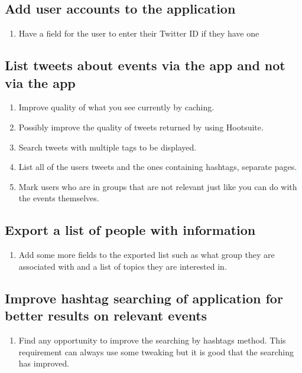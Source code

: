 \documentclass[draftclsnofoot,10pt,onecolumn]{IEEEtran} %
\begin{document}
\subsection{Add user accounts to the application}
\begin{enumerate}
	\item Have a field for the user to enter their Twitter ID if they have one
\end{enumerate}

\subsection{List tweets about events via the app and not via the app}
\begin{enumerate}
	\item Improve quality of what you see currently by caching.
    \item Possibly improve the quality of tweets returned by using Hootsuite.
    \item Search tweets with multiple tags to be displayed.
    \item List all of the users tweets and the ones containing hashtags, separate pages.
    \item Mark users who are in groups that are not relevant just like you can do with the events themselves.
\end{enumerate}

\subsection{Export a list of people with information}
\begin{enumerate}
	\item Add some more fields to the exported list such as what group they are associated with and a list of topics they are interested in.
\end{enumerate}

\subsection{Improve hashtag searching of application for better results on relevant events}
\begin{enumerate}
	\item Find any opportunity to improve the searching by hashtags method. This requirement can always use some tweaking but it is good that the searching has improved.
\end{enumerate}
\end{document}
